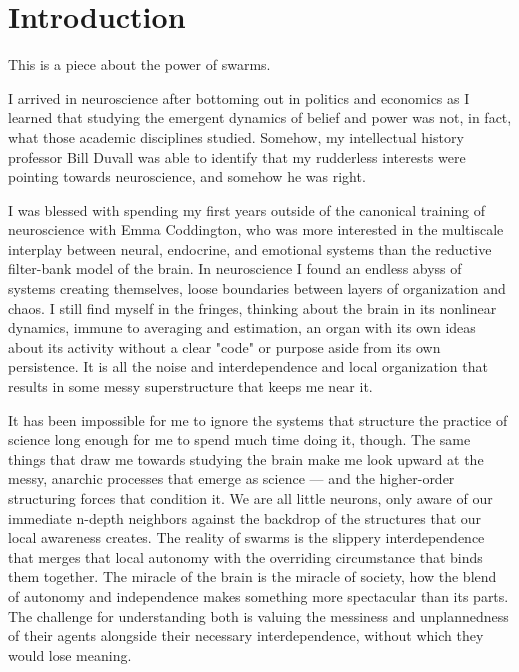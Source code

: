 
\chapter*{Introduction}

This is a piece about the power of swarms.

I arrived in neuroscience after bottoming out in politics and economics as I learned that studying the emergent dynamics of belief and power was not, in fact, what those academic disciplines studied. Somehow, my intellectual history professor Bill Duvall was able to identify that my rudderless interests were pointing towards neuroscience, and somehow he was right.

I was blessed with spending my first years outside of the canonical training of neuroscience with Emma Coddington, who was more interested in the multiscale interplay between neural, endocrine, and emotional systems than the reductive filter-bank model of the brain. In neuroscience I found an endless abyss of systems creating themselves, loose boundaries between layers of organization and chaos. I still find myself in the fringes, thinking about the brain in its nonlinear dynamics, immune to averaging and estimation, an organ with its own ideas about its activity without a clear "code" or purpose aside from its own persistence. It is all the noise and interdependence and local organization that results in some messy superstructure that keeps me near it.

It has been impossible for me to ignore the systems that structure the practice of science long enough for me to spend much time doing it, though. The same things that draw me towards studying the brain make me look upward at the messy, anarchic processes that emerge as science --- and the higher-order structuring forces that condition it. We are all little neurons, only aware of our immediate n-depth neighbors against the backdrop of the structures that our local awareness creates. The reality of swarms is the slippery interdependence that merges that local autonomy with the overriding circumstance that binds them together. The miracle of the brain is the miracle of society, how the blend of autonomy and independence makes something more spectacular than its parts. The challenge for understanding both is valuing the messiness and unplannedness of their agents alongside their necessary interdependence, without which they would lose meaning.

